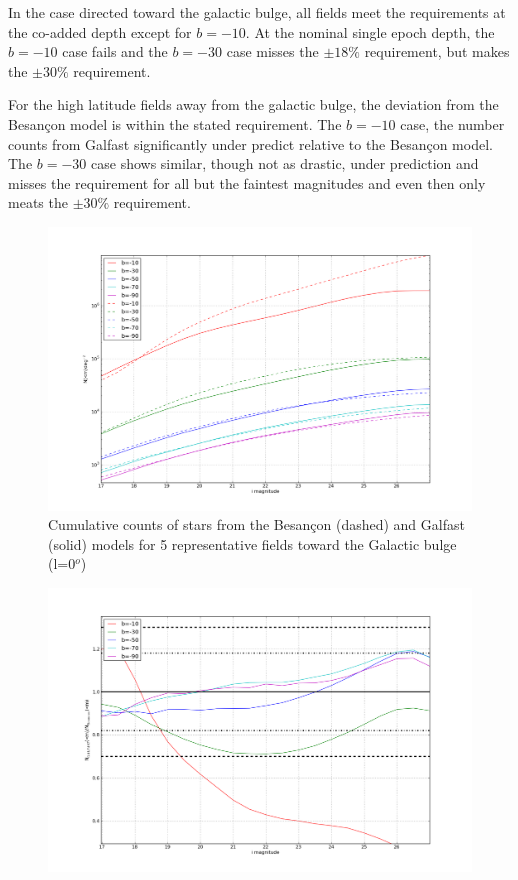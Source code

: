 \documentclass[]{article}
\begin{document}
{In the case directed toward the galactic bulge, all fields meet the requirements at the co-added depth except
for $b=-10$.  At the nominal single epoch depth, the $b=-10$ case fails and the $b=-30$ case misses the $\pm18\%$
requirement, but makes the $\pm30\%$ requirement.

For the high latitude fields away from the galactic bulge, the deviation from the Besan\c{c}on model is within 
the stated requirement.  The $b=-10$ case, the number counts from Galfast significantly under predict relative to 
the Besan\c{c}on model.  The $b=-30$ case shows similar, though not as drastic, under prediction and misses the 
requirement for all but the faintest magnitudes and even then only meats the $\pm30\%$ requirement.

\begin{figure}[H]
\centering
\includegraphics[width=5in]{validation_figures/cumulative_stars_0_besancon_dust.png}
\caption{Cumulative counts of stars from the Besan\c{c}on (dashed) and Galfast (solid) models for 5 representative fields toward the Galactic bulge (l=0$^o$) \label{fig:scounts_0}}
\end{figure}
\begin{figure}[H]
\centering
\includegraphics[width=5in]{validation_figures/cumulative_ratio_stars_0_besancon_dust.png}

\end{figure}}
\end{document}
